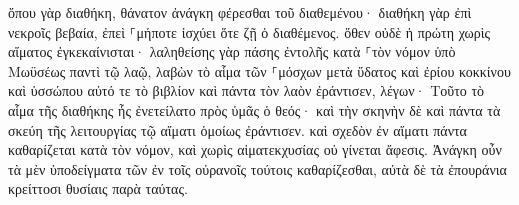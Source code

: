 \documentclass{openreader}
\begin{document}
ὅπου γὰρ διαθήκη, θάνατον ἀνάγκη φέρεσθαι τοῦ διαθεμένου· 
διαθήκη γὰρ ἐπὶ νεκροῖς βεβαία, ἐπεὶ ⸀μήποτε ἰσχύει ὅτε ζῇ ὁ διαθέμενος. 
ὅθεν οὐδὲ ἡ πρώτη χωρὶς αἵματος ἐγκεκαίνισται· 
λαληθείσης γὰρ πάσης ἐντολῆς κατὰ ⸀τὸν νόμον ὑπὸ Μωϋσέως παντὶ τῷ λαῷ, λαβὼν τὸ αἷμα τῶν ⸀μόσχων μετὰ ὕδατος καὶ ἐρίου κοκκίνου καὶ ὑσσώπου αὐτό τε τὸ βιβλίον καὶ πάντα τὸν λαὸν ἐράντισεν, 
λέγων· Τοῦτο τὸ αἷμα τῆς διαθήκης ἧς ἐνετείλατο πρὸς ὑμᾶς ὁ θεός· 
καὶ τὴν σκηνὴν δὲ καὶ πάντα τὰ σκεύη τῆς λειτουργίας τῷ αἵματι ὁμοίως ἐράντισεν. 
καὶ σχεδὸν ἐν αἵματι πάντα καθαρίζεται κατὰ τὸν νόμον, καὶ χωρὶς αἱματεκχυσίας οὐ γίνεται ἄφεσις. 
Ἀνάγκη οὖν τὰ μὲν ὑποδείγματα τῶν ἐν τοῖς οὐρανοῖς τούτοις καθαρίζεσθαι, αὐτὰ δὲ τὰ ἐπουράνια κρείττοσι θυσίαις παρὰ ταύτας. 
\end{document}
